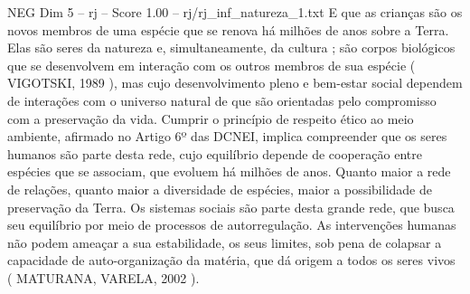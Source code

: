 \begin{textsample}{NEG Dim 5 – rj – Score 1.00 – rj/rj\_inf\_natureza\_1.txt}
E que as crianças são os novos membros de uma espécie que se renova há milhões de anos sobre a Terra.
Elas são seres da natureza e, simultaneamente, da cultura ; são corpos biológicos que se desenvolvem em interação com os outros membros de sua espécie ( VIGOTSKI, 1989 ), mas cujo desenvolvimento pleno e bem-estar social dependem de interações com o universo natural de que são orientadas pelo compromisso com a preservação da vida.
Cumprir o princípio de respeito ético ao meio ambiente, afirmado no Artigo 6º das DCNEI, implica compreender que os seres humanos são parte desta rede, cujo equilíbrio depende de cooperação entre espécies que se associam, que evoluem há milhões de anos.
Quanto maior a rede de relações, quanto maior a diversidade de espécies, maior a possibilidade de preservação da Terra.
Os sistemas sociais são parte desta grande rede, que busca seu equilíbrio por meio de processos de autorregulação.
As intervenções humanas não podem ameaçar a sua estabilidade, os seus limites, sob pena de colapsar a capacidade de auto-organização da matéria, que dá origem a todos os seres vivos ( MATURANA, VARELA, 2002 ).

\end{textsample}
